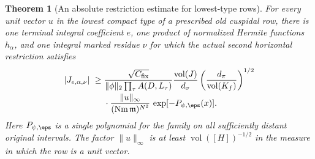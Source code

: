 \documentclass[a4paper,11pt]{article}
\newtheorem{theorem}[proposition]{Theorem}
\theoremstyle{definition}
\theoremstyle{remark}
\numberwithin{equation}{section}
\begin{document}
\begin{theorem}[An absolute restriction estimate for lowest-type rows]\leavevmode
\label{thm:lowesttwo261}
For every unit vector \(u\) in the lowest compact type of a
prescribed old cuspidal row, there is one terminal integral
coefficient \(e\), one product of normalized Hermite functions
\(h_\alpha\), and one integral marked residue \(\nu\) for which
the actual second horizontal restriction satisfies
\[
 \begin{split}
 |J_{e,\alpha,\nu}|\ \ge{}&
 \frac{\sqrt{C_{\rm fix}}}{\|\phi\|_2\prod_\tau A(D,L_\tau)}
 \frac{\operatorname{vol}(J)}{d_\sigma}
 \left(\frac{d_\pi}{\operatorname{vol}(K_f)}\right)^{1/2}\\[-1pt]
 &{}\cdot
 \frac{\|u\|_\infty}{(\operatorname{Nm}\mathfrak m)^{N^2}}\,
                        \exp[-P_{\psi,\eps}(x)] .
 \end{split}
\]
Here \(P_{\psi,\eps}\) is a single polynomial for the family
on all sufficiently distant original intervals. The factor
\(\|u\|_\infty\) is at least \(\operatorname{vol}([H])^{-1/2}\)
in the measure in which the row is a unit vector.
\end{theorem}
\end{document}
